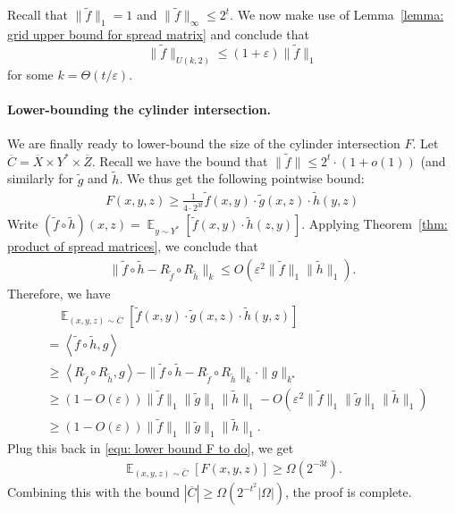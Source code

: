 \documentclass[11pt]{article}
\DeclareMathOperator*{\E}{\mathbb{E}}
\newcommand{\1}{ \mathbbm{1}}
\newcommand{\eps}{\varepsilon}
\begin{document}
Recall that $\|\tilde{f}\|_1 = 1$ and $\|\tilde{f}\|_\infty \le 2^t$. We now make use of Lemma~\ref{lemma: grid upper bound for spread matrix} and conclude that
$$
\| \tilde{f} \|_{U(k,2)} \le (1+\varepsilon) \| \tilde{f}\|_1
$$
for some $k = \Theta(t/\eps)$.

\paragraph*{Lower-bounding the cylinder intersection.} We are finally ready to lower-bound the size of the cylinder intersection $F$. Let $\overline{C} = \overline{X}\times Y^* \times \overline{Z}$. Recall we have the bound that $\|\tilde{f}\|\le 2^{t}\cdot (1+o(1))$ (and similarly for $\tilde{g}$ and $\tilde{h}$. We thus get the following pointwise bound:
\begin{align}
F(x,y,z) 
\ge \frac{1}{4\cdot 2^{3t}} \tilde{f}(x,y)\cdot \tilde{g}(x,z)\cdot \tilde{h}(y,z) \label{equ: lower bound F to do}
\end{align}
Write $(\tilde{f}\circ \tilde{h})(x,z) = \E_{y\sim Y^*}[\tilde{f}(x,y)\cdot \tilde{h}(z,y)]$. Applying Theorem~\ref{thm: product of spread matrices}, we conclude that
\begin{align*}
    \|\tilde{f} \circ \tilde{h} - R_{\tilde{f}} \circ R_{\tilde{h}} \|_k \le O(\eps^2 \|\tilde{f}\|_1\|\tilde{h}\|_1).
\end{align*}
Therefore, we have
\begin{align*}
     &~~~~ \E_{(x,y,z)\sim \overline{C}}[\tilde{f}(x,y)\cdot \tilde{g}(x,z)\cdot \tilde{h}(y,z)] \\
    &= \left\langle \tilde{f}\circ \tilde{h} , g \right\rangle \\
    &\ge \left\langle R_{\tilde{f}} \circ R_{\tilde{h}}, g \right\rangle - \| \tilde{f} \circ \tilde{h} - R_{\tilde{f}} \circ R_{\tilde{h}} \|_k \cdot \| g \|_{k^\star} \\
    &\ge (1-O(\eps)) \|\tilde{f}\|_1\|\tilde{g}\|_1\|\tilde{h}\|_1 - O(\eps^2 \|\tilde{f}\|_1 \|\tilde{g}\|_1 \|\tilde{h}\|_1 ) \\
    &\ge  (1-O(\eps)) \|\tilde{f}\|_1\|\tilde{g}\|_1\|\tilde{h}\|_1.
\end{align*}
Plug this back in \eqref{equ: lower bound F to do}, we get
\begin{align*}
    \E_{(x,y,z)\sim \overline{C}}[F(x,y,z)] \ge \Omega\left( 2^{-3t} \right).
\end{align*}
Combining this with the bound $|\overline{C}| \ge \Omega(2^{-t^2} |\Omega|)$, the proof is complete.
\end{document}
